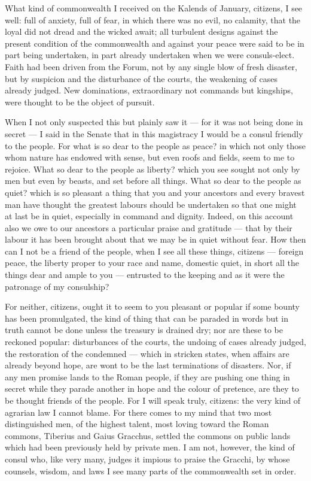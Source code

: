  What kind of commonwealth I received on the Kalends of January, citizens, I see well: full of anxiety, full of fear, in which there was no evil, no calamity, that the loyal did not dread and the wicked await; all turbulent designs against the present condition of the commonwealth and against your peace were said to be in part being undertaken, in part already undertaken when we were consuls-elect. Faith had been driven from the Forum, not by any single blow of fresh disaster, but by suspicion and the disturbance of the courts, the weakening of cases already judged. New dominations, extraordinary not commands but kingships, were thought to be the object of pursuit.

 When I not only suspected this but plainly saw it --- for it was not being done in secret --- I said in the Senate that in this magistracy I would be a consul friendly to the people. For what is so dear to the people as peace? in which not only those whom nature has endowed with sense, but even roofs and fields, seem to me to rejoice. What so dear to the people as liberty? which you see sought not only by men but even by beasts, and set before all things. What so dear to the people as quiet? which is so pleasant a thing that you and your ancestors and every bravest man have thought the greatest labours should be undertaken so that one might at last be in quiet, especially in command and dignity. Indeed, on this account also we owe to our ancestors a particular praise and gratitude --- that by their labour it has been brought about that we may be in quiet without fear. How then can I not be a friend of the people, when I see all these things, citizens --- foreign peace, the liberty proper to your race and name, domestic quiet, in short all the things dear and ample to you --- entrusted to the keeping and as it were the patronage of my consulship?

 For neither, citizens, ought it to seem to you pleasant or popular if some bounty has been promulgated, the kind of thing that can be paraded in words but in truth cannot be done unless the treasury is drained dry; nor are these to be reckoned popular: disturbances of the courts, the undoing of cases already judged, the restoration of the condemned --- which in stricken states, when affairs are already beyond hope, are wont to be the last terminations of disasters. Nor, if any men promise lands to the Roman people, if they are pushing one thing in secret while they parade another in hope and the colour of pretence, are they to be thought friends of the people. For I will speak truly, citizens: the very kind of agrarian law I cannot blame. For there comes to my mind that two most distinguished men, of the highest talent, most loving toward the Roman commons, Tiberius and Gaius Gracchus, settled the commons on public lands which had been previously held by private men. I am not, however, the kind of consul who, like very many, judges it impious to praise the Gracchi, by whose counsels, wisdom, and laws I see many parts of the commonwealth set in order.

